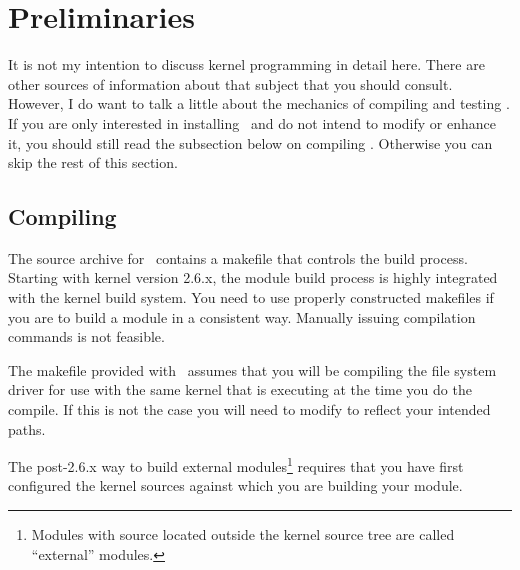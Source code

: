 %
%
%
%

\section{Preliminaries}
\label{sec:preliminaries}

It is not my intention to discuss kernel programming in detail here. There are other sources of
information about that subject that you should consult. However, I do want to talk a little
about the mechanics of compiling and testing \GenericFS. If you are only interested in
installing \GenericFS\ and do not intend to modify or enhance it, you should still read the
subsection below on compiling \GenericFS. Otherwise you can skip the rest of this section.

\subsection{Compiling \GenericFS}
\label{sec:compiling}

The source archive for \GenericFS\ contains a makefile that controls the build process. Starting
with kernel version 2.6.x, the module build process is highly integrated with the kernel build
system. You need to use properly constructed makefiles if you are to build a module in a
consistent way. Manually issuing compilation commands is not feasible.

The makefile provided with \GenericFS\ assumes that you will be compiling the file system driver
for use with the same kernel that is executing at the time you do the compile. If this is not
the case you will need to modify  to reflect your intended paths.

The post-2.6.x way to build external modules\footnote{Modules with source located outside the
  kernel source tree are called ``external'' modules.} requires that you have first configured
the kernel sources against which you are building your module.


